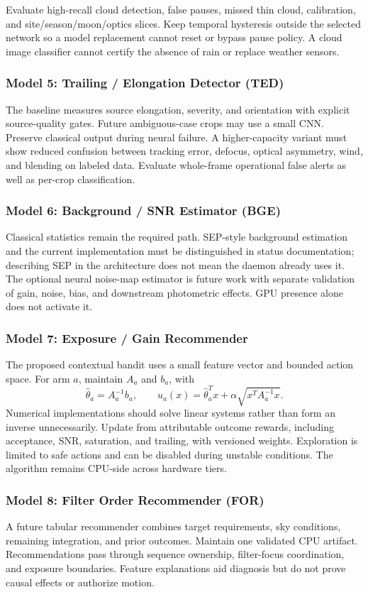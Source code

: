 \documentclass[11pt,a4paper]{article}
\begin{document}
Evaluate high-recall cloud detection, false pauses, missed thin cloud, calibration,
and site/season/moon/optics slices. Keep temporal hysteresis outside the selected
network so a model replacement cannot reset or bypass pause policy. A cloud
image classifier cannot certify the absence of rain or replace weather sensors.

\subsubsection{Model 5: Trailing / Elongation Detector (TED)}
The baseline measures source elongation, severity, and orientation with explicit
source-quality gates. Future ambiguous-case crops may use a small CNN. Preserve
classical output during neural failure. A higher-capacity variant must show
reduced confusion between tracking error, defocus, optical asymmetry, wind, and
blending on labeled data. Evaluate whole-frame operational false alerts as well
as per-crop classification.

\subsubsection{Model 6: Background / SNR Estimator (BGE)}
Classical statistics remain the required path. SEP-style background estimation
and the current implementation must be distinguished in status documentation;
describing SEP in the architecture does not mean the daemon already uses it.
The optional neural noise-map estimator is future work with separate validation
of gain, noise, bias, and downstream photometric effects. GPU presence alone
does not activate it.

\subsubsection{Model 7: Exposure / Gain Recommender}
The proposed contextual bandit uses a small feature vector and bounded action
space. For arm $a$, maintain $A_a$ and $b_a$, with
\[
\hat\theta_a=A_a^{-1}b_a,\qquad
u_a(x)=\hat\theta_a^Tx+\alpha\sqrt{x^TA_a^{-1}x}.
\]
Numerical implementations should solve linear systems rather than form an
inverse unnecessarily. Update from attributable outcome rewards, including
acceptance, SNR, saturation, and trailing, with versioned weights. Exploration
is limited to safe actions and can be disabled during unstable conditions.
The algorithm remains CPU-side across hardware tiers.

\subsubsection{Model 8: Filter Order Recommender (FOR)}
A future tabular recommender combines target requirements, sky conditions,
remaining integration, and prior outcomes. Maintain one validated CPU artifact.
Recommendations pass through sequence ownership, filter-focus coordination,
and exposure boundaries. Feature explanations aid diagnosis but do not prove
causal effects or authorize motion.
\end{document}
